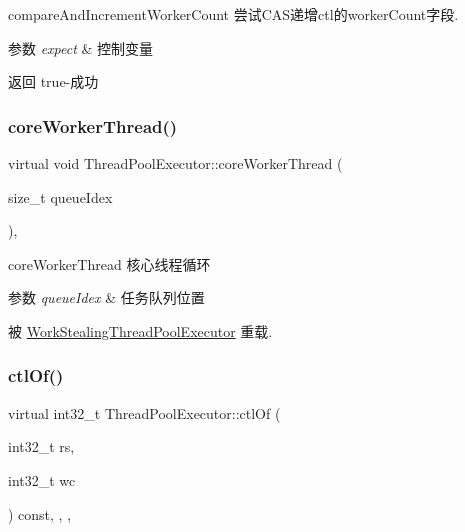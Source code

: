 compare\+And\+Increment\+Worker\+Count 尝试\+C\+A\+S递增ctl的worker\+Count字段. 


\begin{DoxyParams}{参数}
{\em expect} & 控制变量\\
\hline
\end{DoxyParams}
\begin{DoxyReturn}{返回}
true-\/成功 
\end{DoxyReturn}
\mbox{\label{classThreadPoolExecutor_a5e40839bf4191b5eab9d81227ddb62c3}} 
\subsubsection{\texorpdfstring{core\+Worker\+Thread()}{coreWorkerThread()}}
{\footnotesize\ttfamily virtual void Thread\+Pool\+Executor\+::core\+Worker\+Thread (\begin{DoxyParamCaption}\item[{size\+\_\+t}]{queue\+Idex }\end{DoxyParamCaption})\hspace{0.3cm}{\ttfamily [protected]}, {\ttfamily [virtual]}}



core\+Worker\+Thread 核心线程循环 


\begin{DoxyParams}{参数}
{\em queue\+Idex} & 任务队列位置 \\
\hline
\end{DoxyParams}


被 \hyperlink{classWorkStealingThreadPoolExecutor_ae4170b80bdc4ec806ee4a04cc5daaada}{Work\+Stealing\+Thread\+Pool\+Executor} 重载.

\mbox{\label{classThreadPoolExecutor_a31ed7a73571c79c8dbb486f27a4df4eb}} 
\subsubsection{\texorpdfstring{ctl\+Of()}{ctlOf()}}
{\footnotesize\ttfamily virtual int32\+\_\+t Thread\+Pool\+Executor\+::ctl\+Of (\begin{DoxyParamCaption}\item[{int32\+\_\+t}]{rs,  }\item[{int32\+\_\+t}]{wc }\end{DoxyParamCaption}) const\hspace{0.3cm}{\ttfamily [inline]}, {\ttfamily [final]}, {\ttfamily [protected]}, {\ttfamily [virtual]}}



